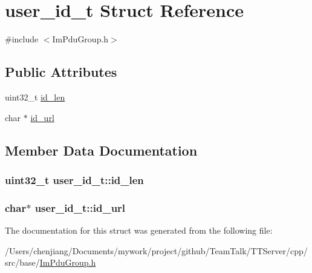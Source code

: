 \hypertarget{structuser__id__t}{}\section{user\+\_\+id\+\_\+t Struct Reference}
\label{structuser__id__t}


{\ttfamily \#include $<$Im\+Pdu\+Group.\+h$>$}

\subsection*{Public Attributes}
\begin{DoxyCompactItemize}
\item 
uint32\+\_\+t \hyperlink{structuser__id__t_a244239d5168096262055af047978be20}{id\+\_\+len}
\item 
char $\ast$ \hyperlink{structuser__id__t_a606779337f76cd92b8dce23e00a3da64}{id\+\_\+url}
\end{DoxyCompactItemize}


\subsection{Member Data Documentation}
\hypertarget{structuser__id__t_a244239d5168096262055af047978be20}{}
\subsubsection[{id\+\_\+len}]{\setlength{\rightskip}{0pt plus 5cm}uint32\+\_\+t user\+\_\+id\+\_\+t\+::id\+\_\+len}\label{structuser__id__t_a244239d5168096262055af047978be20}
\hypertarget{structuser__id__t_a606779337f76cd92b8dce23e00a3da64}{}
\subsubsection[{id\+\_\+url}]{\setlength{\rightskip}{0pt plus 5cm}char$\ast$ user\+\_\+id\+\_\+t\+::id\+\_\+url}\label{structuser__id__t_a606779337f76cd92b8dce23e00a3da64}


The documentation for this struct was generated from the following file\+:\begin{DoxyCompactItemize}
\item 
/\+Users/chenjiang/\+Documents/mywork/project/github/\+Team\+Talk/\+T\+T\+Server/cpp/src/base/\hyperlink{_im_pdu_group_8h}{Im\+Pdu\+Group.\+h}\end{DoxyCompactItemize}
